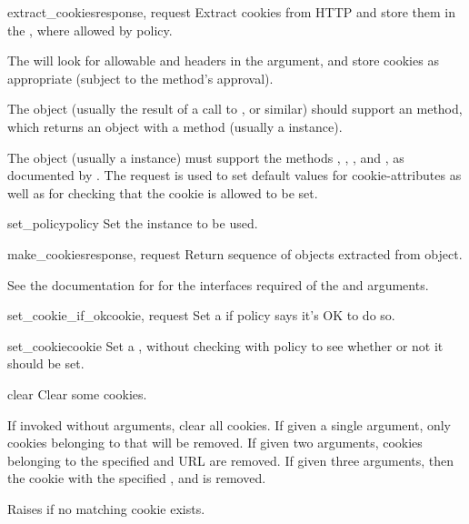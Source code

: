 \begin{methoddesc}[CookieJar]{extract_cookies}{response, request}
Extract cookies from HTTP  and store them in the
, where allowed by policy.

The  will look for allowable 
and  headers in the  argument,
and store cookies as appropriate (subject to the
 method's approval).

The  object (usually the result of a call to
, or similar) should support an
 method, which returns an object with a
 method (usually a
 instance).

The  object (usually a  instance)
must support the methods , ,
, and , as
documented by .  The request is used to set default
values for cookie-attributes as well as for checking that the cookie
is allowed to be set.
\end{methoddesc}

\begin{methoddesc}[CookieJar]{set_policy}{policy}
Set the  instance to be used.
\end{methoddesc}

\begin{methoddesc}[CookieJar]{make_cookies}{response, request}
Return sequence of  objects extracted from
 object.

See the documentation for  for the interfaces
required of the  and  arguments.
\end{methoddesc}

\begin{methoddesc}[CookieJar]{set_cookie_if_ok}{cookie, request}
Set a  if policy says it's OK to do so.
\end{methoddesc}

\begin{methoddesc}[CookieJar]{set_cookie}{cookie}
Set a , without checking with policy to see whether or
not it should be set.
\end{methoddesc}

\begin{methoddesc}[CookieJar]{clear}{}
Clear some cookies.

If invoked without arguments, clear all cookies.  If given a single
argument, only cookies belonging to that  will be removed.
If given two arguments, cookies belonging to the specified
 and URL  are removed.  If given three
arguments, then the cookie with the specified , 
and  is removed.

Raises  if no matching cookie exists.
\end{methoddesc}

